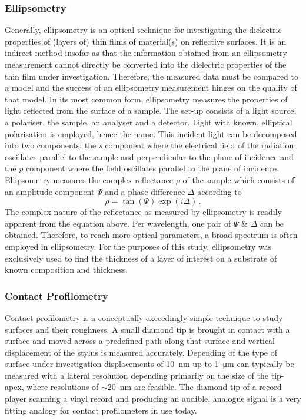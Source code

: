 \subsubsection{Ellipsometry}
Generally, ellipsometry is an optical technique for investigating the dielectric properties of (layers of) thin films of material(s) on reflective surfaces. It is an indirect method insofar as that the information obtained from an ellipsometry measurement cannot directly be converted into the dielectric properties of the thin film under investigation. Therefore, the measured data must be compared to a model and the success of an ellipsometry measurement hinges on the quality of that model. In its most common form, ellipsometry measures the properties of light reflected from the surface of a sample. The set-up consists of a light source, a polariser, the sample, an analyser and a detector. Light with known, elliptical polarisation is employed, hence the name. This incident light can be decomposed into two components: the \emph{s} component where the electrical field of the radiation oscillates parallel to the sample and perpendicular to the plane of incidence and the \emph{p} component where the field oscillates parallel to the plane of incidence. Ellipsometry measures the complex reflectance $\rho$ of the sample which consists of an amplitude component $\Psi$ and a phase difference $\Delta$ according to
\begin{equation}
	\rho = \tan \left( \Psi \right) \exp \left( i \Delta \right) \, .
\end{equation}
The complex nature of the reflectance as measured by ellipsometry is readily apparent from the equation above. Per wavelength, one pair of $\Psi$ \& $\Delta$ can be obtained. Therefore, to reach more optical parameters, a broad spectrum is often employed in ellipsometry. For the purposes of this study, ellipsometry was exclusively used to find the thickness of a layer of interest on a substrate of known composition and thickness.
\subsubsection{Contact Profilometry}
Contact profilometry is a conceptually exceedingly simple technique to study surfaces and their roughness. A small diamond tip is brought in contact with a surface and moved across a predefined path along that surface and vertical displacement of the stylus is measured accurately. Depending of the type of surface under investigation displacements of \SI{10}{\nano\metre} up to \SI{1}{\micro\metre} can typically be measured with a lateral resolution depending primarily on the size of the tip-apex, where resolutions of $\sim$\SI{20}{\nano\metre} are feasible. The diamond tip of a record player scanning a vinyl record and producing an audible, analogue signal is a very fitting analogy for contact profilometers in use today.
